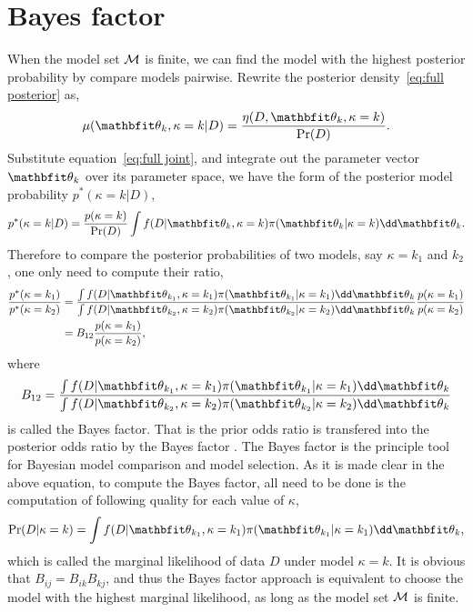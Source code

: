 \section{Bayes factor}
\label{sec:Bayes factor}

When the model set $\mathcal{M}$ is finite, we can find the model with the highest
posterior probability by compare models pairwise. Rewrite the posterior
density~\eqref{eq:full posterior} as,
\begin{equation}
  \mu(\bth_k,\kappa=k|D) = \frac{\eta(D,\bth_k,\kappa=k)}{\Pr(D)}.
\end{equation}
Substitute equation~\eqref{eq:full joint}, and integrate out the parameter
vector $\bth_k$ over its parameter space, we have the form of the posterior
model probability $p^*(\kappa=k|D)$,
\begin{equation}
  p^*(\kappa=k|D) = \frac{p(\kappa = k)}{\Pr(D)}
  \int f(D|\bth_k,\kappa = k)\pi(\bth_k|\kappa = k)\dd\bth_k.
\end{equation}
Therefore to compare the posterior probabilities of two models, say $\kappa =
k_1$ and $k_2$, one only need to compute their ratio,
\begin{align*}
  \frac{p^*(\kappa = k_1)}{p^*(\kappa = k_2)} &= \frac
  {\int f(D|\bth_{k_1},\kappa=k_1)\pi(\bth_{k_1}|\kappa=k_1)\dd\bth_k}
  {\int f(D|\bth_{k_2},\kappa=k_2)\pi(\bth_{k_2}|\kappa=k_2)\dd\bth_k}
  \frac{p(\kappa=k_1)}{p(\kappa=k_2)} \\
  & = B_{12} \frac{p(\kappa=k_1)}{p(\kappa=k_2)},
  \label{eq:posterior odd}
\end{align*}
where
\begin{equation}
  B_{12} = \frac
  {\int f(D|\bth_{k_1},\kappa=k_1)\pi(\bth_{k_1}|\kappa=k_1)\dd\bth_k}
  {\int f(D|\bth_{k_2},\kappa=k_2)\pi(\bth_{k_2}|\kappa=k_2)\dd\bth_k}
  \label{eq:bayes factor}
\end{equation}
is called the Bayes factor. That is the prior odds ratio is transfered into
the posterior odds ratio by the Bayes factor \parencite{Kass1995}. The Bayes
factor is the principle tool for Bayesian model comparison and model
selection. As it is made clear in the above equation, to compute the Bayes
factor, all need to be done is the computation of following quality for each
value of $\kappa$,
\begin{equation}
  \Pr(D|\kappa = k)
  = \int f(D|\bth_{k_1},\kappa=k_1)\pi(\bth_{k_1}|\kappa=k_1)\dd\bth_k,
  \label{eq:marginal likelihood}
\end{equation}
which is called the marginal likelihood of data $D$ under model $\kappa = k$.
It is obvious that $B_{ij} = B_{ik} B_{kj}$, and thus the Bayes factor
approach is equivalent to choose the model with the highest marginal
likelihood, as long as the model set $\mathcal{M}$ is finite.


